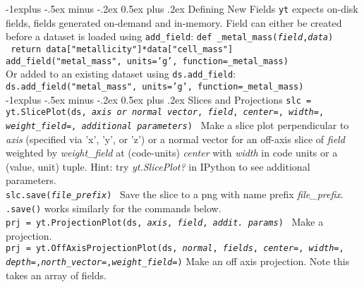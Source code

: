 \documentclass[10pt,landscape]{article}
\makeatletter
\renewcommand{\subsection}{\@startsection{subsection}{2}{0mm}%
                                {-1explus -.5ex minus -.2ex}%
                                {0.5ex plus .2ex}%
                                {\normalfont\normalsize\bfseries}}
\makeatother
\begin{document}
\begin{multicols}{3}
\subsection{Defining New Fields}
\texttt{yt} expects on-disk fields, fields generated on-demand and in-memory. 
Field can either be created before a dataset is loaded using \texttt{add\_field}:
\texttt{def \_metal\_mass({\it field},{\it data})}\\
\texttt{\hspace{4 mm} return data["metallicity"]*data["cell\_mass"]}\\
\texttt{add\_field("metal\_mass", units='g', function=\_metal\_mass)}\\
Or added to an existing dataset using \texttt{ds.add\_field}:
\texttt{ds.add\_field("metal\_mass", units='g', function=\_metal\_mass)}\\

\subsection{Slices and Projections}
\texttt{slc = yt.SlicePlot(ds, {\it axis or normal vector}, {\it field}, {\it center=}, {\it width=}, {\it weight\_field=}, {\it additional parameters})} \textemdash\ Make a slice plot
perpendicular to {\it axis} (specified via 'x', 'y', or 'z') or a normal vector for an off-axis slice of {\it field} weighted by {\it weight\_field} at (code-units) {\it center} with 
{\it width} in code units or a (value, unit) tuple. Hint: try {\it yt.SlicePlot?} in IPython to see additional parameters.\\
\texttt{slc.save({\it file\_prefix})} \textemdash\ Save the slice to a png with name prefix {\it file\_prefix}.
\texttt{.save()} works similarly for the commands below.\\

\texttt{prj = yt.ProjectionPlot(ds, {\it axis}, {\it field}, {\it addit. params})} \textemdash\ Make a projection. \\
\texttt{prj = yt.OffAxisProjectionPlot(ds, {\it normal}, {\it fields}, {\it center=}, {\it width=}, {\it depth=},{\it north\_vector=},{\it weight\_field=})} \textemdash Make an off axis projection. Note this takes an array of fields. \\


\end{multicols}
\end{document}
